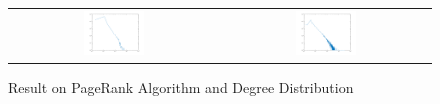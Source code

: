 \begin{figure}[H]
\begin{center}
\begin{tabular}{cc}
     \includegraphics[width=0.3\textwidth]{FIG/10pagerank.png} &
     \includegraphics[width=0.3\textwidth]{FIG/10degreedist.png} \\
\end{tabular}
\caption{Result on PageRank Algorithm and Degree Distribution}
\end{center}
\end{figure}